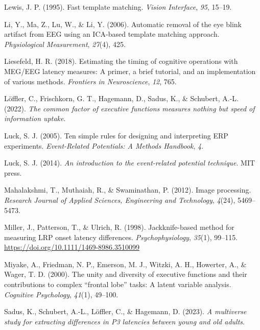 \documentclass[
  man,floatsintext]{apa7}
\newlength{\cslhangindent}
\newlength{\cslentryspacingunit} %
\newenvironment{CSLReferences}[2] %
 {%
  \setlength{\parindent}{0pt}
  \ifodd #1
  \let\oldpar\par
  \def\par{\hangindent=\cslhangindent\oldpar}
  \fi
  \setlength{\parskip}{#2\cslentryspacingunit}
 }%
 {}
\begin{document}
\begin{CSLReferences}{1}{0}
\leavevmode{}%
Lewis, J. P. (1995). Fast template matching. \emph{Vision Interface}, \emph{95}, 15--19.

\leavevmode{}%
Li, Y., Ma, Z., Lu, W., \& Li, Y. (2006). Automatic removal of the eye blink artifact from {EEG} using an {ICA}-based template matching approach. \emph{Physiological Measurement}, \emph{27}(4), 425.

\leavevmode{}%
Liesefeld, H. R. (2018). Estimating the timing of cognitive operations with {MEG}/{EEG} latency measures: A primer, a brief tutorial, and an implementation of various methods. \emph{Frontiers in Neuroscience}, \emph{12}, 765.

\leavevmode{}%
Löffler, C., Frischkorn, G. T., Hagemann, D., Sadus, K., \& Schubert, A.-L. (2022). \emph{The common factor of executive functions measures nothing but speed of information uptake}.

\leavevmode{}%
Luck, S. J. (2005). Ten simple rules for designing and interpreting {ERP} experiments. \emph{Event-Related Potentials: A Methods Handbook}, \emph{4}.

\leavevmode{}%
Luck, S. J. (2014). \emph{An introduction to the event-related potential technique}. MIT press.

\leavevmode{}%
Mahalakshmi, T., Muthaiah, R., \& Swaminathan, P. (2012). Image processing. \emph{Research Journal of Applied Sciences, Engineering and Technology}, \emph{4}(24), 5469--5473.

\leavevmode{}%
Miller, J., Patterson, T., \& Ulrich, R. (1998). Jackknife-based method for measuring {LRP} onset latency differences. \emph{Psychophysiology}, \emph{35}(1), 99--115. \url{https://doi.org/10.1111/1469-8986.3510099}

\leavevmode{}%
Miyake, A., Friedman, N. P., Emerson, M. J., Witzki, A. H., Howerter, A., \& Wager, T. D. (2000). The unity and diversity of executive functions and their contributions to complex {``frontal lobe''} tasks: {A} latent variable analysis. \emph{Cognitive Psychology}, \emph{41}(1), 49--100.

\leavevmode{}%
Sadus, K., Schubert, A.-L., Löffler, C., \& Hagemann, D. (2023). \emph{A multiverse study for extracting differences in {P3} latencies between young and old adults}.


\end{CSLReferences}
\end{document}
